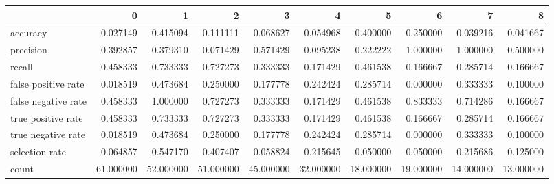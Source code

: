\begin{tabular}{lrrrrrrrrr}
\toprule
{} &          0 &          1 &          2 &          3 &          4 &          5 &          6 &          7 &          8 \\
\midrule
accuracy            &   0.027149 &   0.415094 &   0.111111 &   0.068627 &   0.054968 &   0.400000 &   0.250000 &   0.039216 &   0.041667 \\
precision           &   0.392857 &   0.379310 &   0.071429 &   0.571429 &   0.095238 &   0.222222 &   1.000000 &   1.000000 &   0.500000 \\
recall              &   0.458333 &   0.733333 &   0.727273 &   0.333333 &   0.171429 &   0.461538 &   0.166667 &   0.285714 &   0.166667 \\
false positive rate &   0.018519 &   0.473684 &   0.250000 &   0.177778 &   0.242424 &   0.285714 &   0.000000 &   0.333333 &   0.100000 \\
false negative rate &   0.458333 &   1.000000 &   0.727273 &   0.333333 &   0.171429 &   0.461538 &   0.833333 &   0.714286 &   0.166667 \\
true positive rate  &   0.458333 &   0.733333 &   0.727273 &   0.333333 &   0.171429 &   0.461538 &   0.166667 &   0.285714 &   0.166667 \\
true negative rate  &   0.018519 &   0.473684 &   0.250000 &   0.177778 &   0.242424 &   0.285714 &   0.000000 &   0.333333 &   0.100000 \\
selection rate      &   0.064857 &   0.547170 &   0.407407 &   0.058824 &   0.215645 &   0.050000 &   0.050000 &   0.215686 &   0.125000 \\
count               &  61.000000 &  52.000000 &  51.000000 &  45.000000 &  32.000000 &  18.000000 &  19.000000 &  14.000000 &  13.000000 \\
\bottomrule
\end{tabular}
